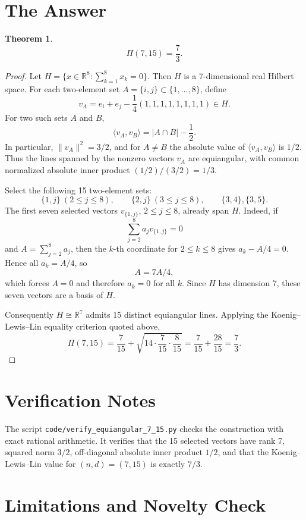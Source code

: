 \documentclass[11pt]{article}
\newtheorem{theorem}{Theorem}
\newcommand{\R}{\mathbb{R}}
\newcommand{\PiRel}{\Pi}
\begin{document}
\section*{The Answer}

\begin{theorem}
\[
  \PiRel(7,15)=\frac73.
\]
\end{theorem}

\begin{proof}
Let \(H=\{x\in \R^8:\sum_{k=1}^8 x_k=0\}\).  Then \(H\) is a
7-dimensional real Hilbert space.  For each two-element set
\(A=\{i,j\}\subset\{1,\ldots,8\}\), define
\[
  v_A=e_i+e_j-\frac14(1,1,1,1,1,1,1,1)\in H.
\]
For two such sets \(A\) and \(B\),
\[
  \langle v_A,v_B\rangle = |A\cap B|-\frac12.
\]
In particular, \(\|v_A\|^2=3/2\), and for \(A\ne B\) the absolute value of
\(\langle v_A,v_B\rangle\) is \(1/2\).  Thus the lines spanned by the
nonzero vectors \(v_A\) are equiangular, with common normalized absolute
inner product \((1/2)/(3/2)=1/3\).

Select the following 15 two-element sets:
\[
  \{1,j\}\ (2\le j\le 8),\qquad
  \{2,j\}\ (3\le j\le 8),\qquad
  \{3,4\},\{3,5\}.
\]
The first seven selected vectors \(v_{\{1,j\}}\), \(2\le j\le 8\), already
span \(H\).  Indeed, if
\[
  \sum_{j=2}^8 a_j v_{\{1,j\}}=0
\]
and \(A=\sum_{j=2}^8 a_j\), then the \(k\)-th coordinate for \(2\le k\le 8\)
gives \(a_k-A/4=0\).  Hence all \(a_k=A/4\), so
\[
  A=7A/4,
\]
which forces \(A=0\) and therefore \(a_k=0\) for all \(k\).  Since \(H\) has
dimension 7, these seven vectors are a basis of \(H\).

Consequently \(H\cong\R^7\) admits 15 distinct equiangular lines.  Applying
the Koenig--Lewis--Lin equality criterion quoted above,
\[
  \PiRel(7,15)
  =
  \frac7{15}+
  \sqrt{14\cdot \frac7{15}\cdot \frac8{15}}
  =
  \frac7{15}+\frac{28}{15}
  =
  \frac73.
\]
\end{proof}

\section*{Verification Notes}

The script \texttt{code/verify\_equiangular\_7\_15.py} checks the construction
with exact rational arithmetic.  It verifies that the 15 selected vectors have
rank 7, squared norm \(3/2\), off-diagonal absolute inner product \(1/2\), and
that the Koenig--Lewis--Lin value for \((n,d)=(7,15)\) is exactly \(7/3\).

\section*{Limitations and Novelty Check}
\end{document}
